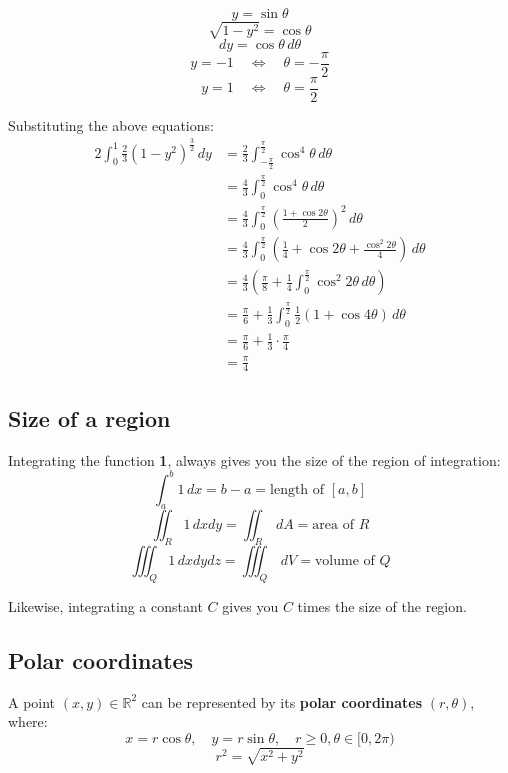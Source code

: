 \documentclass[11pt]{article}
\begin{document}
\[y = \sin \theta\]
\[\sqrt{1 - y^2} = \cos \theta\]
\[dy = \cos \theta \, d \theta\]
\[y = -1 \quad \Leftrightarrow \quad \theta = - \frac{\pi}{2}\]
\[y = 1 \quad \Leftrightarrow \quad \theta = \frac{\pi}{2}\]

Substituting the above equations:
\begin{align*}
2 \int_0^1 \frac{2}{3} (1 - y^2)^{\frac{3}{2}} \, dy &= \frac{2}{3} \int_{-\frac{\pi}{2}}^{\frac{\pi}{2}} \cos^4 \theta \, d \theta \\
&= \frac{4}{3} \int_{0}^{\frac{\pi}{2}} \cos^4 \theta \, d \theta \\
&= \frac{4}{3} \int_{0}^{\frac{\pi}{2}} \left(\frac{1 + \cos 2 \theta}{2} \right)^2 \, d \theta \\
&= \frac{4}{3} \int_{0}^{\frac{\pi}{2}} \left(\frac{1}{4} + \cos 2 \theta + \frac{\cos^2 2 \theta}{4} \right) \, d \theta \\
&= \frac{4}{3} \left(\frac{\pi}{8} + \frac{1}{4} \int_0^{\frac{\pi}{2}} \cos^2 2 \theta \, d \theta \right) \\
&= \frac{\pi}{6} + \frac{1}{3} \int_0^{\frac{\pi}{2}} \frac{1}{2} (1 + \cos 4 \theta) \, d \theta \\
&= \frac{\pi}{6} + \frac{1}{3} \cdot \frac{\pi}{4} \\
&= \frac{\pi}{4}
\end{align*}

\subsection{Size of a region}
\label{sec:org1698558}
Integrating the function \textbf{1}, always gives you the size of the region of integration:
\[\int_a^b 1 \, dx = b - a = \text{length of } [a, b]\]
\[\iint_R 1 \, dx dy = \iint_R \, dA = \text{area of } R\]
\[\iiint_Q 1 \, dx dy dz = \iiint_Q \, dV = \text{volume of } Q\]

Likewise, integrating a constant \(C\) gives you \(C\) times the size of the region.

\newpage

\subsection{Polar coordinates}
\label{sec:org1f0da6b}
A point \((x, y) \in \mathbb{R}^2\) can be represented by its \textbf{polar coordinates} \((r, \theta)\), where:
\[x = r \cos \theta, \quad y = r \sin \theta, \quad r \ge 0, \theta \in [0, 2 \pi)\]
\[r^2 = \sqrt{x^2 + y^2}\]
\end{document}
